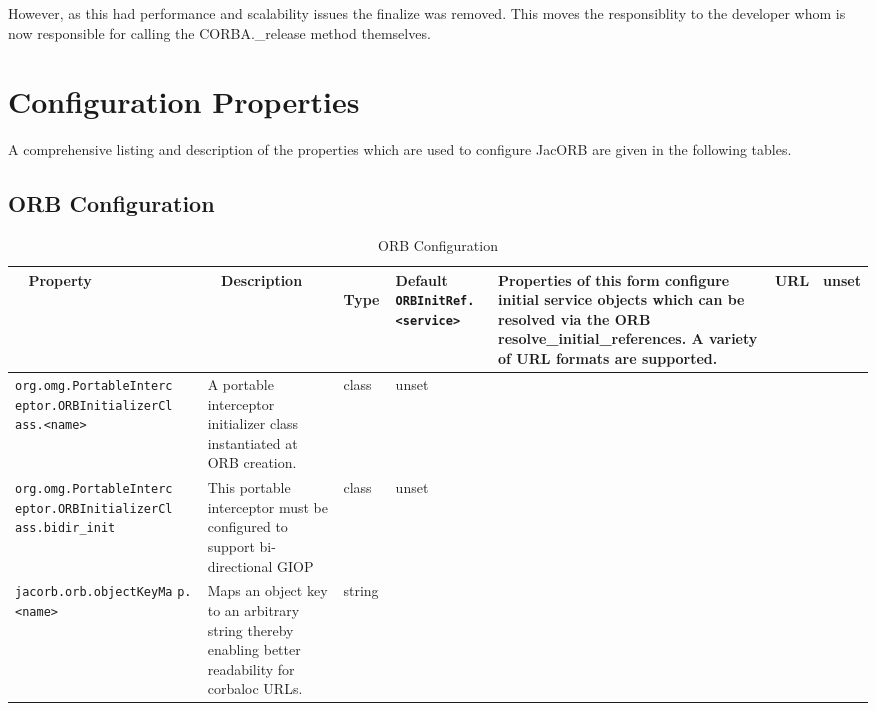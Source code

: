 However, as this had performance and scalability issues the finalize was
removed. This moves the responsiblity to the developer whom is now responsible
for calling the CORBA.\_release method themselves.

\section{Configuration Properties}

A comprehensive listing and description of the properties which are used
to configure JacORB are given in the following tables.

\subsection{ORB Configuration}
\begin{small}
\begin{longtable}{|p{5cm}|p{7.5cm}|p{1.5cm}|p{1.5cm}|}
\caption{ORB Configuration}\\
\hline
~ \hfill \textbf {Property} \hfill ~ & ~ \hfill \textbf {Description}
\hfill ~ & ~ \hfill \textbf {Type} \hfill ~ & \hfill \textbf{Default} \endhead
\hline
\verb"ORBInitRef.<service>" & Properties of this form configure
initial service objects which can be resolved via the ORB
resolve\_initial\_references. A variety of URL formats are
supported. & URL & unset \\
\hline
\verb"org.omg.PortableInterc"
\verb"eptor.ORBInitializerCl"
\verb"ass.<name>" & A portable interceptor initializer class
instantiated at ORB creation. & class & unset \\
\hline
\verb"org.omg.PortableInterc"
\verb"eptor.ORBInitializerCl"
\verb"ass.bidir_init" & This portable interceptor must be configured
to support bi-directional GIOP & class & unset \\
\hline
\verb"jacorb.orb.objectKeyMa"
\verb"p.<name>" & Maps an object key to an arbitrary string thereby
enabling better readability for corbaloc URLs. & string & \\
\hline


\end{longtable}
\end{small}
